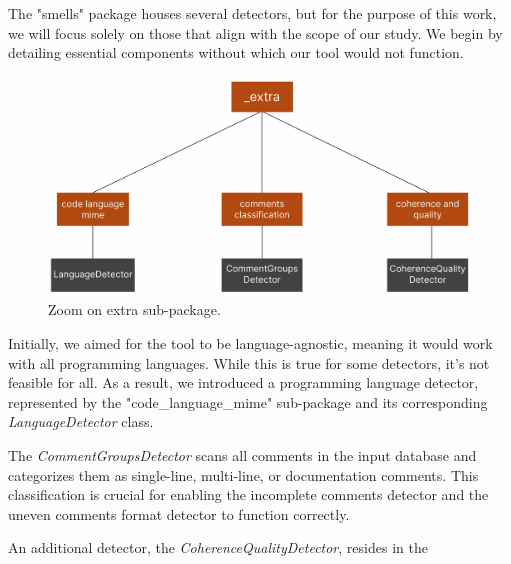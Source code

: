 \noindent The "smells" package houses several detectors, but for the purpose of this work, we will focus solely on those that align with the scope of our study. We begin by detailing essential components without which our tool would not function.

\begin{figure}[ht]
	\centering\includegraphics[width=400pt]{figs/zoom-extra.PNG}
	\captionsetup{justification=centering}
	\caption{Zoom on extra sub-package.}
	\label{fig:zoom-extra}
\end{figure}

\noindent Initially, we aimed for the tool to be language-agnostic, meaning it would work with all programming languages. While this is true for some detectors, it’s not feasible for all. As a result, we introduced a programming language detector, represented by the "code\_language\_mime" sub-package and its corresponding \textit{LanguageDetector} class.

\noindent The \textit{CommentGroupsDetector} scans all comments in the input database and categorizes them as single-line, multi-line, or documentation comments. This classification is crucial for enabling the incomplete comments detector and the uneven comments format detector to function correctly.

\noindent An additional detector, the \textit{CoherenceQualityDetector}, resides in the 

